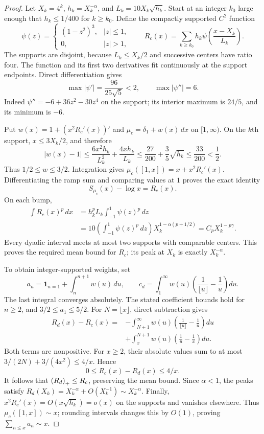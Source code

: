 \begin{proof}
Let $X_k=4^k$, $h_k=X_k^{-\alpha}$, and
$L_k=10X_k\sqrt{h_k}$. Start at an integer $k_0$ large enough that
$h_k\le1/400$ for $k\ge k_0$. Define the compactly supported $C^2$
function
\[
 \psi(z)=\begin{cases}(1-z^2)^3,&|z|\le1,\\0,&|z|>1,\end{cases}
 \qquad
 R_c(x)=\sum_{k\ge k_0}h_k\psi\left(\frac{x-X_k}{L_k}\right).
\]
The supports are disjoint, because $L_k\le X_k/2$ and successive
centers have ratio four. The function and its first two derivatives
fit continuously at the support endpoints. Direct differentiation gives
\[
 \max|\psi'|=\frac{96}{25\sqrt5}<2,
 \qquad \max|\psi''|=6.
\]
Indeed $\psi''=-6+36z^2-30z^4$ on the support; its interior maximum
is $24/5$, and its minimum is $-6$.

Put $w(x)=1+(x^2R_c'(x))'$ and
$\mu_c=\delta_1+w(x)\,dx$ on $[1,\infty)$. On the $k$th support,
$x\le3X_k/2$, and therefore
\[
 |w(x)-1|
 \le\frac{6x^2h_k}{L_k^2}+\frac{4xh_k}{L_k}
 \le\frac{27}{200}+\frac35\sqrt{h_k}
 \le\frac{33}{200}<\frac12.
\]
Thus $1/2\le w\le3/2$. Integration gives
$\mu_c([1,x])=x+x^2R_c'(x)$. Differentiating the ramp sum and
comparing values at $1$ proves the exact identity
\begin{equation}\label{eq:mpt-continuous-id}
 S_{\mu_c}(x)-\log x=R_c(x).
\end{equation}
On each bump,
\begin{align*}
 \int R_c(x)^p\,dx
 &=h_k^pL_k\int_{-1}^1\psi(z)^p\,dz\\
 &=10\left(\int_{-1}^1\psi(z)^p\,dz\right)
 X_k^{1-\alpha(p+1/2)}
 =C_pX_k^{1-p\gamma}.
\end{align*}
Every dyadic interval meets at most two supports with comparable
centers. This proves the required mean bound for $R_c$; its peak
at $X_k$ is exactly $X_k^{-\alpha}$.

To obtain integer-supported weights, set
\[
 a_n=\mathbf1_{n=1}+\int_n^{n+1}w(u)\,du,
 \qquad
 c_d=\int_1^\infty w(u)
 \left(\frac1{\lfloor u\rfloor}-\frac1u\right)du.
\]
The last integral converges absolutely. The stated coefficient bounds
hold for $n\ge2$, and $3/2\le a_1\le5/2$.
For $N=\lfloor x\rfloor$, direct subtraction gives
\begin{align}
 R_d(x)-R_c(x)
 ={}&-\int_{N+1}^\infty w(u)
       \left(\frac1{\lfloor u\rfloor}-\frac1u\right)du\nonumber\\
 &+\int_x^{N+1}w(u)\left(\frac1u-\frac1x\right)du.
 \label{eq:mpt-discrete-id}
\end{align}
Both terms are nonpositive. For $x\ge2$, their absolute values sum to
at most $3/(2N)+3/(4x^2)\le4/x$. Hence
\begin{equation}\label{eq:mpt-discrete-error}
 0\le R_c(x)-R_d(x)\le4/x.
\end{equation}
It follows that $\left(R_d\right)_{+}\le R_c$, preserving the mean bound.
Since $\alpha<1$, the peaks satisfy
$R_d(X_k)=X_k^{-\alpha}+O(X_k^{-1})\sim X_k^{-\alpha}$.
Finally, $x^2R_c'(x)=O(x\sqrt{h_k})=o(x)$ on the supports and
vanishes elsewhere. Thus $\mu_c([1,x])\sim x$; rounding intervals
changes this by $O(1)$, proving $\sum_{n\le x}a_n\sim x$.
\end{proof}

